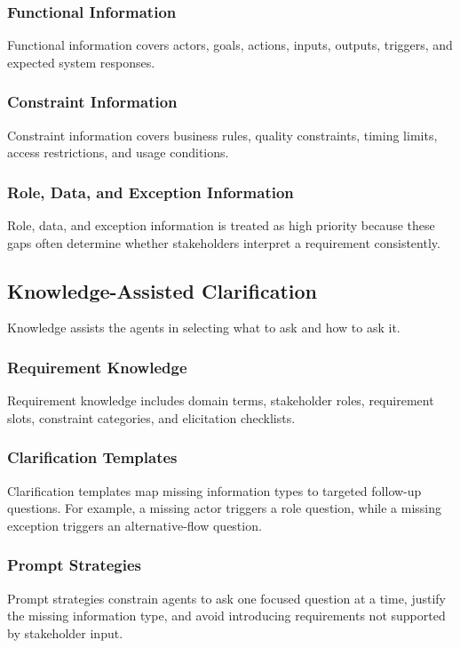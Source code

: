 \subsubsection{Functional Information}
Functional information covers actors, goals, actions, inputs, outputs, triggers, and expected system responses.

\subsubsection{Constraint Information}
Constraint information covers business rules, quality constraints, timing limits, access restrictions, and usage conditions.

\subsubsection{Role, Data, and Exception Information}
Role, data, and exception information is treated as high priority because these gaps often determine whether stakeholders interpret a requirement consistently.

\subsection{Knowledge-Assisted Clarification}
Knowledge assists the agents in selecting what to ask and how to ask it.

\subsubsection{Requirement Knowledge}
Requirement knowledge includes domain terms, stakeholder roles, requirement slots, constraint categories, and elicitation checklists.

\subsubsection{Clarification Templates}
Clarification templates map missing information types to targeted follow-up questions.
For example, a missing actor triggers a role question, while a missing exception triggers an alternative-flow question.

\subsubsection{Prompt Strategies}
Prompt strategies constrain agents to ask one focused question at a time, justify the missing information type, and avoid introducing requirements not supported by stakeholder input.

